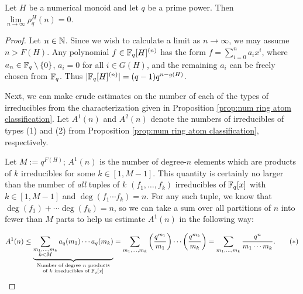 \begin{thm}
Let $H$ be a numerical monoid and let $q$ be a prime power.
Then $\lim\limits_{n\to\infty} \rho_q^H(n) = 0$.
\end{thm}

\begin{proof}
Let $n\in \mathbb{N}$.
Since we wish to calculate a limit as $n\to\infty$, we may assume $n> F(H)$.
Any polynomial $f\in \mathbb{F}_q[H]^{(n)}$ has the form $f = \sum_{i=0}^n a_i x^i$, where $a_n \in \mathbb{F}_q\setminus\{0\}$, $a_i = 0$ for all $i\in G(H)$, and the remaining $a_i$ can be freely chosen from $\mathbb{F}_q$.
Thus $|\mathbb{F}_q[H]^{(n)}| = (q-1)q^{n-g(H)}$.

Next, we can make crude estimates on the number of each of the types of irreducibles from the characterization given in Proposition \ref{prop:num ring atom classification}.
Let $A^1(n)$ and $A^2(n)$ denote the numbers of irreducibles of types (1) and (2) from Proposition \ref{prop:num ring atom classification}, respectively.

Let $M := q^{F(H)}$; $A^1(n)$ is the number of degree-$n$ elements which are products of $k$ irreducibles for some $k\in [1,M-1]$.
This quantity is certainly no larger than the number of \textit{all} tuples of $k$ $(f_1,\dots,f_k)$ irreducibles of $\mathbb{F}_q[x]$ with $k\in [1,M-1]$ and $\deg(f_1\cdots f_k) = n$.
For any such tuple, we know that $\deg(f_1) + \cdots \deg(f_k) = n$, so we can take a sum over all partitions of $n$ into fewer than $M$ parts to help us estimate $A^1(n)$ in the following way:

\[ A^1(n) \le 
 \underbrace{\sum_{\substack{m_1,\dots, m_k \\ k < M}} a_q(m_1)\cdots a_q(m_k)}_{\substack{\textrm{Number of degree $n$ products} \\ \textrm{of $k$ irreducibles of $\mathbb{F}_q[x]$}}}
= \sum_{m_1,\dots,m_k} \left(\frac{q^{m_1}}{m_1}\right)\cdots \left(\frac{q^{m_k}}{m_k}\right) 
=  \sum_{m_1,\dots,m_k} \frac{q^n}{m_1\cdots m_k}. \tag{$*$}
\]


\end{proof}

